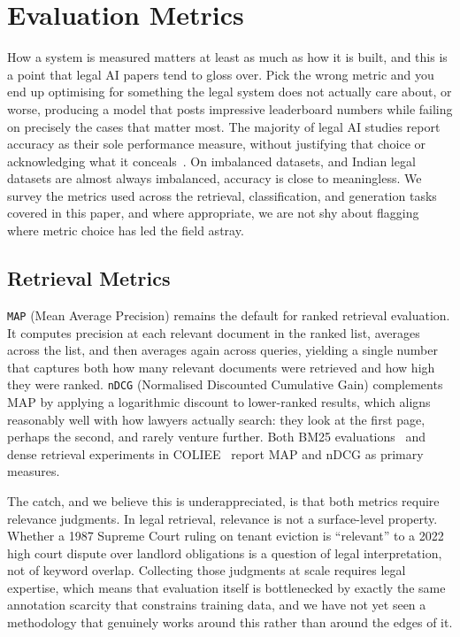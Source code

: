 \section{Evaluation Metrics}

How a system is measured matters at least as much as how it is built, and this is a point that legal AI papers tend to gloss over. Pick the wrong metric and you end up optimising for something the legal system does not actually care about, or worse, producing a model that posts impressive leaderboard numbers while failing on precisely the cases that matter most. The majority of legal AI studies report accuracy as their sole performance measure, without justifying that choice or acknowledging what it conceals~\cite{medvedeva-etal-2020-echr}. On imbalanced datasets, and Indian legal datasets are almost always imbalanced, accuracy is close to meaningless. We survey the metrics used across the retrieval, classification, and generation tasks covered in this paper, and where appropriate, we are not shy about flagging where metric choice has led the field astray.

\subsection{Retrieval Metrics}

\texttt{MAP} (Mean Average Precision) remains the default for ranked retrieval evaluation. It computes precision at each relevant document in the ranked list, averages across the list, and then averages again across queries, yielding a single number that captures both how many relevant documents were retrieved and how high they were ranked. \texttt{nDCG} (Normalised Discounted Cumulative Gain) complements MAP by applying a logarithmic discount to lower-ranked results, which aligns reasonably well with how lawyers actually search: they look at the first page, perhaps the second, and rarely venture further. Both BM25 evaluations~\cite{rosa-etal-2021-bm25} and dense retrieval experiments in COLIEE~\cite{althammer-etal-2021-dossier} report MAP and nDCG as primary measures.

The catch, and we believe this is underappreciated, is that both metrics require relevance judgments. In legal retrieval, relevance is not a surface-level property. Whether a 1987 Supreme Court ruling on tenant eviction is ``relevant'' to a 2022 high court dispute over landlord obligations is a question of legal interpretation, not of keyword overlap. Collecting those judgments at scale requires legal expertise, which means that evaluation itself is bottlenecked by exactly the same annotation scarcity that constrains training data, and we have not yet seen a methodology that genuinely works around this rather than around the edges of it.

